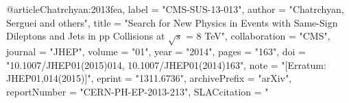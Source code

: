 @article{Chatrchyan:2013fea,
      label          = "CMS-SUS-13-013",
      author         = "Chatrchyan, Serguei and others",
      title          = "{Search for New Physics in Events with Same-Sign
                        Dileptons and Jets in pp Collisions at $\sqrt{s}$ = 8
                        TeV}",
      collaboration  = "CMS",
      journal        = "JHEP",
      volume         = "01",
      year           = "2014",
      pages          = "163",
      doi            = "10.1007/JHEP01(2015)014, 10.1007/JHEP01(2014)163",
      note           = "[Erratum: JHEP01,014(2015)]",
      eprint         = "1311.6736",
      archivePrefix  = "arXiv",
      reportNumber   = "CERN-PH-EP-2013-213",
      SLACcitation   = "%
}

